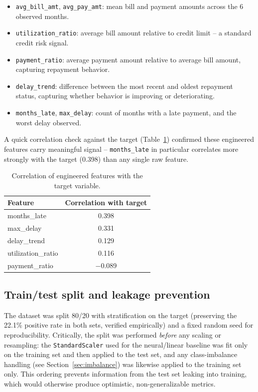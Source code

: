 \documentclass[11pt]{article}
\begin{document}
\begin{itemize}[nosep]
    \item \texttt{avg\_bill\_amt}, \texttt{avg\_pay\_amt}: mean bill and
    payment amounts across the 6 observed months.
    \item \texttt{utilization\_ratio}: average bill amount relative to
    credit limit -- a standard credit risk signal.
    \item \texttt{payment\_ratio}: average payment amount relative to
    average bill amount, capturing repayment behavior.
    \item \texttt{delay\_trend}: difference between the most recent and
    oldest repayment status, capturing whether behavior is improving or
    deteriorating.
    \item \texttt{months\_late}, \texttt{max\_delay}: count of months with
    a late payment, and the worst delay observed.
\end{itemize}

A quick correlation check against the target (Table~\ref{tab:corr})
confirmed these engineered features carry meaningful signal --
\texttt{months\_late} in particular correlates more strongly with the
target (0.398) than any single raw feature.

\begin{table}[H]
\centering
\caption{Correlation of engineered features with the target variable.}
\label{tab:corr}
\begin{tabular}{lc}
\toprule
\textbf{Feature} & \textbf{Correlation with target} \\
\midrule
months\_late        & 0.398 \\
max\_delay          & 0.331 \\
delay\_trend        & 0.129 \\
utilization\_ratio  & 0.116 \\
payment\_ratio      & $-$0.089 \\
\bottomrule
\end{tabular}
\end{table}

\subsection{Train/test split and leakage prevention}
The dataset was split 80/20 with stratification on the target (preserving
the 22.1\% positive rate in both sets, verified empirically) and a fixed
random seed for reproducibility. Critically, the split was performed
\emph{before} any scaling or resampling: the \texttt{StandardScaler} used
for the neural/linear baseline was fit only on the training set and then
applied to the test set, and any class-imbalance handling (see
Section~\ref{sec:imbalance}) was likewise applied to the training set only.
This ordering prevents information from the test set leaking into training,
which would otherwise produce optimistic, non-generalizable metrics.
\end{document}
